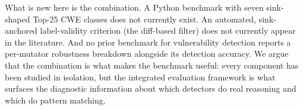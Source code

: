 What is new here is the combination. A Python benchmark with
seven sink-shaped Top-25 CWE classes does not currently exist.
An automated, sink-anchored label-validity criterion (the diff-based
filter) does not currently appear in the literature. And no prior
benchmark for vulnerability detection reports a per-mutator
robustness breakdown alongside its detection accuracy. We argue
that the combination is what makes the benchmark useful: every
component has been studied in isolation, but the integrated
evaluation framework is what surfaces the diagnostic information
about which detectors do real reasoning and which do pattern
matching.
